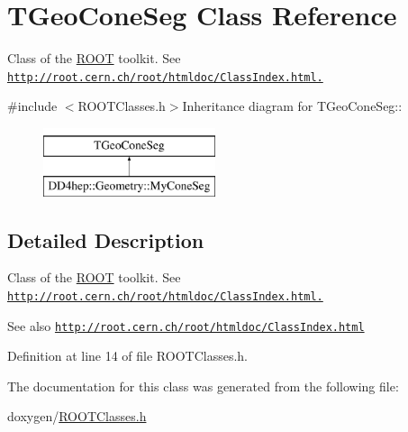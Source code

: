 \hypertarget{class_t_geo_cone_seg}{
\section{TGeoConeSeg Class Reference}
\label{class_t_geo_cone_seg}
}


Class of the \hyperlink{namespace_r_o_o_t}{ROOT} toolkit. See \href{http://root.cern.ch/root/htmldoc/ClassIndex.html.}{\tt http://root.cern.ch/root/htmldoc/ClassIndex.html.}  


{\ttfamily \#include $<$ROOTClasses.h$>$}Inheritance diagram for TGeoConeSeg::\begin{figure}[H]
\begin{center}
\leavevmode
\includegraphics[height=2cm]{class_t_geo_cone_seg}
\end{center}
\end{figure}


\subsection{Detailed Description}
Class of the \hyperlink{namespace_r_o_o_t}{ROOT} toolkit. See \href{http://root.cern.ch/root/htmldoc/ClassIndex.html.}{\tt http://root.cern.ch/root/htmldoc/ClassIndex.html.} \begin{DoxySeeAlso}{See also}
\href{http://root.cern.ch/root/htmldoc/ClassIndex.html}{\tt http://root.cern.ch/root/htmldoc/ClassIndex.html} 
\end{DoxySeeAlso}


Definition at line 14 of file ROOTClasses.h.

The documentation for this class was generated from the following file:\begin{DoxyCompactItemize}
\item 
doxygen/\hyperlink{_r_o_o_t_classes_8h}{ROOTClasses.h}\end{DoxyCompactItemize}
